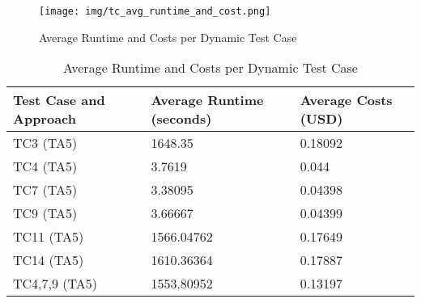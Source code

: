 \begin{figure}[ht]
  \centering
  \texttt{[image: img/tc\_avg\_runtime\_and\_cost.png]}
  \caption{Average Runtime and Costs per Dynamic Test Case}
  \label{fig:tc_avg_runtime_and_cost}
\end{figure}

\begin{table}[h!]
  \begin{tabular}{|l | l | l|}
    \hline
    \textbf{Test Case and Approach} & \textbf{Average Runtime (seconds)} & \textbf{Average Costs (USD)} \\
    \hline
    TC3 (TA5) & 1648.35 & 0.18092 \\
    \hline
    TC4 (TA5) & 3.7619 & 0.044 \\
    \hline
    TC7 (TA5) & 3.38095 & 0.04398 \\
    \hline
    TC9 (TA5) & 3.66667 & 0.04399 \\
    \hline
    TC11 (TA5) & 1566.04762 & 0.17649 \\
    \hline
    TC14 (TA5) & 1610.36364 & 0.17887 \\
    \hline
    TC4,7,9 (TA5) & 1553.80952 & 0.13197 \\
    \hline
  \end{tabular}
  \caption{Average Runtime and Costs per Dynamic Test Case}
  \label{tab:tc_avg_runtime_and_cost}
\end{table}
